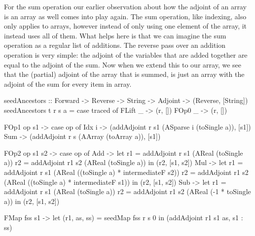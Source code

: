         For the sum operation our earlier observation about how the adjoint of an array is an array as well comes into play again.
        The sum operation, like indexing, also only applies to arrays, however instead of only using one element of the array, it instead uses all of them.
        What helps here is that we can imagine the sum operation as a regular list of additions.
        The reverse pass over an addition operation is very simple: the adjoint of the variables that are added together are equal to the adjoint of the sum.
        Now when we extend this to our array, we see that the (partial) adjoint of the array that is summed, is just an array with the adjoint of the sum for every item in array.

        \begin{haskell}[caption={Function for seeding ancestors of a node. \texttt{seedAncestors} takes in the forward-pass trace, the current reverse-pass map, the name of the item to seed the ancestors of, and the adjoint of that item to seed its ancestors with; and outputs a tuple containing an updated reverse-pass, and a list of strings of items to evaluate to add to the reverse-pass queue.}, label=lst:seedanc, gobble=12]
            seedAncestors :: Forward -> Reverse -> String -> Adjoint -> (Reverse, [String])
            seedAncestors t r s a = case traced of
                FLift _        -> (r, [])
                FOp0  _        -> (r, [])

                FOp1  op s1    -> case op of
                    Idx i -> (addAdjoint r s1 (ASparse i (toSingle a)), [s1])
                    Sum   -> (addAdjoint r s (AArray (toArray a)), [s1])
                
                FOp2  op s1 s2 -> case op of
                    Add -> 
                        let r1 = addAdjoint r  s1 (AReal (toSingle a))
                            r2 = addAdjoint r1 s2 (AReal (toSingle a))
                        in  (r2, [s1, s2])
                    Mul ->
                        let r1 = addAdjoint r  s1 (AReal ((toSingle a) * intermediateF s2))
                            r2 = addAdjoint r1 s2 (AReal ((toSingle a) * intermediateF s1))
                        in  (r2, [s1, s2])
                    Sub ->
                        let r1 = addAdjoint r  s1 (AReal (toSingle a))
                            r2 = addAdjoint r1 s2 (AReal (-1 * toSingle a))
                        in  (r2, [s1, s2])
                
                FMap  fss s1   ->
                    let (r1, as, ss) = seedMap fss r s 0
                    in  (addAdjoint r1 s1 as, s1 : ss)
                

\end{haskell}
